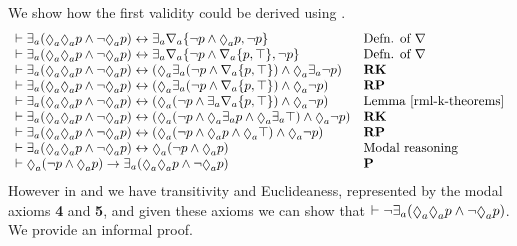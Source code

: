 We show how the first validity could be derived using \axiomRmlK{}.
$$
\begin{array}{ll}
    \proves \somerefsA (\possibleA \possibleA \atomP \land \lnot \possibleA \atomP) \iff \somerefsA \coversA \{\lnot \atomP \land \possibleA \atomP, \lnot \atomP\} & \text{Defn. of $\covers$}\\
    \proves \somerefsA (\possibleA \possibleA \atomP \land \lnot \possibleA \atomP) \iff \somerefsA \coversA \{\lnot \atomP \land \coversA \{\atomP, \top\}, \lnot \atomP\} & \text{Defn. of $\covers$}\\
    \proves \somerefsA (\possibleA \possibleA \atomP \land \lnot \possibleA \atomP) \iff (\possibleA \somerefsA (\lnot \atomP \land \coversA \{\atomP, \top\}) \land \possibleA \somerefsA \lnot \atomP)& {\bf RK}\\
    \proves \somerefsA (\possibleA \possibleA \atomP \land \lnot \possibleA \atomP) \iff (\possibleA \somerefsA (\lnot \atomP \land \coversA \{\atomP, \top\}) \land \possibleA \lnot \atomP)& {\bf RP}\\
    \proves \somerefsA (\possibleA \possibleA \atomP \land \lnot \possibleA \atomP) \iff (\possibleA (\lnot \atomP \land \somerefsA \coversA \{\atomP, \top\}) \land \possibleA \lnot \atomP)& \text{Lemma~\ref{rml-k-theorems}}\\
    \proves \somerefsA (\possibleA \possibleA \atomP \land \lnot \possibleA \atomP) \iff (\possibleA (\lnot \atomP \land \possibleA \somerefsA \atomP \land \possibleA \somerefsA \top) \land \possibleA \lnot \atomP)& {\bf RK}\\
    \proves \somerefsA (\possibleA \possibleA \atomP \land \lnot \possibleA \atomP) \iff (\possibleA (\lnot \atomP \land \possibleA \atomP \land \possibleA \top) \land \possibleA \lnot \atomP)& {\bf RP}\\
    \proves \somerefsA (\possibleA \possibleA \atomP \land \lnot \possibleA \atomP) \iff \possibleA (\lnot \atomP \land \possibleA \atomP)& \text{Modal reasoning}\\
    \proves \possibleA (\lnot \atomP \land \possibleA \atomP) \implies \somerefsA (\possibleA \possibleA \atomP \land \lnot \possibleA \atomP) & {\bf P}
\end{array}
$$
However in \logicRmlKFF{} and \logicRmlKD{} we have transitivity and Euclideaness, represented by the modal axioms {\bf 4} and {\bf 5}, and given these axioms we can show that $\proves \lnot \somerefsA (\possibleA \possibleA \atomP \land \lnot \possibleA \atomP)$.
We provide an informal proof.
